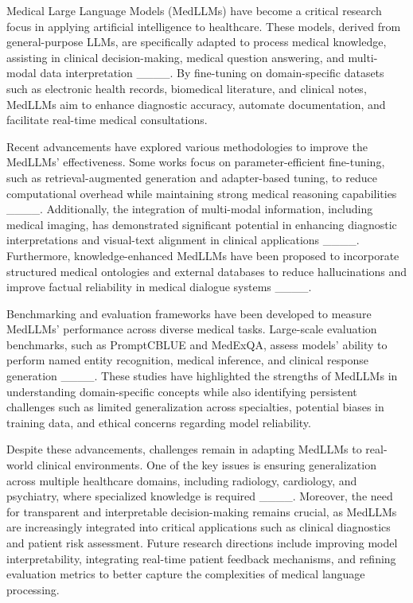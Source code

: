 Medical Large Language Models (MedLLMs) have become a critical research focus in applying artificial intelligence to healthcare. These models, derived from general-purpose LLMs, are specifically adapted to process medical knowledge, assisting in clinical decision-making, medical question answering, and multi-modal data interpretation ____. By fine-tuning on domain-specific datasets such as electronic health records, biomedical literature, and clinical notes, MedLLMs aim to enhance diagnostic accuracy, automate documentation, and facilitate real-time medical consultations.

Recent advancements have explored various methodologies to improve the MedLLMs' effectiveness. Some works focus on parameter-efficient fine-tuning, such as retrieval-augmented generation and adapter-based tuning, to reduce computational overhead while maintaining strong medical reasoning capabilities ____. Additionally, the integration of multi-modal information, including medical imaging, has demonstrated significant potential in enhancing diagnostic interpretations and visual-text alignment in clinical applications ____. Furthermore, knowledge-enhanced MedLLMs have been proposed to incorporate structured medical ontologies and external databases to reduce hallucinations and improve factual reliability in medical dialogue systems ____.

Benchmarking and evaluation frameworks have been developed to measure MedLLMs' performance across diverse medical tasks. Large-scale evaluation benchmarks, such as PromptCBLUE and MedExQA, assess models' ability to perform named entity recognition, medical inference, and clinical response generation ____. These studies have highlighted the strengths of MedLLMs in understanding domain-specific concepts while also identifying persistent challenges such as limited generalization across specialties, potential biases in training data, and ethical concerns regarding model reliability.

Despite these advancements, challenges remain in adapting MedLLMs to real-world clinical environments. One of the key issues is ensuring generalization across multiple healthcare domains, including radiology, cardiology, and psychiatry, where specialized knowledge is required ____. Moreover, the need for transparent and interpretable decision-making remains crucial, as MedLLMs are increasingly integrated into critical applications such as clinical diagnostics and patient risk assessment. Future research directions include improving model interpretability, integrating real-time patient feedback mechanisms, and refining evaluation metrics to better capture the complexities of medical language processing.